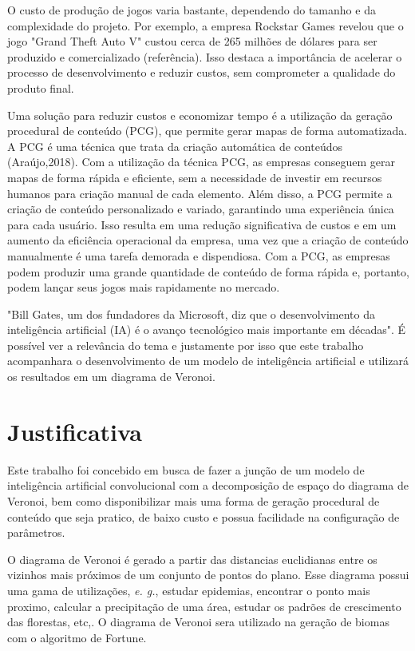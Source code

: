 \documentclass[12pt]{tcc}
\begin{document}
O custo de produção de jogos varia bastante, dependendo do tamanho e da complexidade do projeto. Por exemplo, a empresa Rockstar Games revelou que o jogo "Grand Theft Auto V" custou cerca de 265 milhões de dólares para ser produzido e comercializado (referência). Isso destaca a importância de acelerar o processo de desenvolvimento e reduzir custos, sem comprometer a qualidade do produto final.

Uma solução para reduzir custos e economizar tempo é a utilização da geração procedural de conteúdo (PCG), que permite gerar mapas de forma automatizada. A PCG é uma técnica que trata da criação automática de conteúdos (Araújo,2018). Com a utilização da técnica PCG, as empresas conseguem gerar mapas de forma rápida e eficiente, sem a necessidade de investir em recursos humanos para criação manual de cada elemento. Além disso, a PCG permite a criação de conteúdo personalizado e variado, garantindo uma experiência única para cada usuário. Isso resulta em uma redução significativa de custos e em um aumento da eficiência operacional da empresa, uma vez que a criação de conteúdo manualmente é uma tarefa demorada e dispendiosa. Com a PCG, as empresas podem produzir uma grande quantidade de conteúdo de forma rápida e, portanto, podem lançar seus jogos mais rapidamente no mercado.

"Bill Gates, um dos fundadores da Microsoft, diz que o desenvolvimento da inteligência artificial (IA) é o avanço tecnológico mais importante em décadas"\space\citep{inteligencia_artificial_e_avanco_bbc}. É possível ver
a relevância do tema e justamente por isso que este trabalho acompanhara o desenvolvimento
de um modelo de inteligência artificial e utilizará os resultados em um diagrama de Veronoi.
\section{Justificativa}

Este trabalho foi concebido em busca de fazer a junção de um modelo de inteligência artificial convolucional com a decomposição de espaço do diagrama de Veronoi, bem como disponibilizar mais uma forma de geração procedural de conteúdo que seja pratico, de baixo custo e possua
facilidade na configuração de parâmetros.

O diagrama de Veronoi é gerado a partir das distancias euclidianas entre os vizinhos mais próximos de um conjunto de pontos do plano\space\citep{diagrama_de_voronoi:_uma_exploracao_nas_distancias_euclidiana_e_do_taxi}. Esse diagrama possui uma gama de utilizações, \emph{e. g.}, estudar epidemias, encontrar o ponto mais proximo, calcular a precipitação de uma área, estudar os padrões de crescimento das florestas, etc,\space\citep{poligonos_de_thiessen_ou_voronoi}. O diagrama de Veronoi sera utilizado na geração de biomas com o algoritmo de Fortune.
\end{document}
